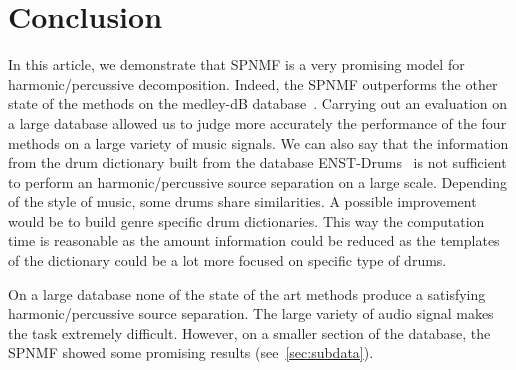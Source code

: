 \section{Conclusion}
\label{sec:conc}

In this article, we demonstrate that SPNMF is a very promising model for harmonic/percussive decomposition. Indeed, the SPNMF outperforms the other state of the methods on the medley-dB database~\cite{bittner2014medleydb}. Carrying out an evaluation on a large database allowed us to judge more accurately the performance of the four methods on a large variety of music signals. We can also say that the information from the drum dictionary built from the database ENST-Drums~\cite{gillet2006enst} is not sufficient to perform an harmonic/percussive source separation on a large scale. Depending of the style of music, some drums share similarities. A possible improvement would be to build genre specific drum dictionaries. This way the computation time is reasonable as the amount information could be reduced as the templates of the dictionary could be a lot more focused on specific type of drums. 


On a large database none of the state of the art methods produce a satisfying harmonic/percussive source separation. The large variety of audio signal makes the task extremely difficult. However, on a smaller section of the database, the SPNMF showed some promising results (see~\ref{sec:subdata}).

